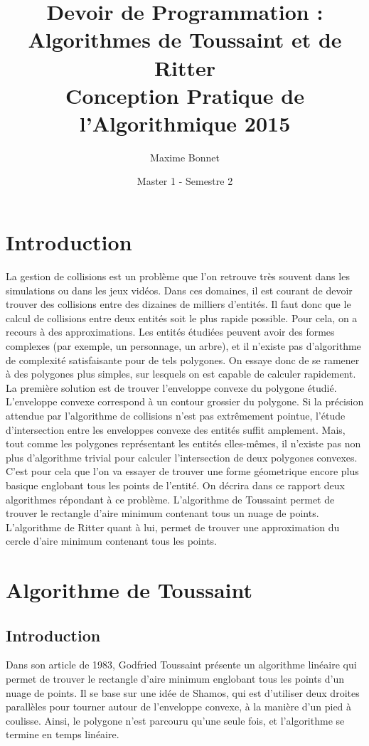 \documentclass[12pt]{report}
\title{
{Devoir de Programmation : Algorithmes de Toussaint et de Ritter}\\
{Conception Pratique de l'Algorithmique 2015}
}
\author{Maxime Bonnet}
\date{Master 1 - Semestre 2}
\begin{document}
\lstset{language=Java}
\maketitle

\tableofcontents
\chapter{Introduction}
La gestion de collisions est un problème que l'on retrouve très souvent dans les simulations ou dans les jeux vidéos. Dans ces domaines, il est courant de devoir trouver des collisions entre des dizaines de milliers d'entités. Il faut donc que le calcul de collisions entre deux entités soit le plus rapide possible. Pour cela, on a recours à des approximations. Les entités étudiées peuvent avoir des formes complexes (par exemple, un personnage, un arbre), et il n'existe pas d'algorithme de complexité satisfaisante pour de tels polygones. On essaye donc de se ramener à des polygones plus simples, sur lesquels on est capable de calculer rapidement. La première solution est de trouver l'enveloppe convexe du polygone étudié. L'enveloppe convexe correspond à un contour grossier du polygone. Si la précision attendue par l'algorithme de collisions n'est pas extrêmement pointue, l'étude d'intersection entre les enveloppes convexe des entités suffit amplement. Mais, tout comme les polygones représentant les entités elles-mêmes, il n'existe pas non plus d'algorithme trivial pour calculer l'intersection de deux polygones convexes. C'est pour cela que l'on va essayer de trouver une forme géometrique encore plus basique englobant tous les points de l'entité. On décrira dans ce rapport deux algorithmes répondant à ce problème. L'algorithme de Toussaint permet de trouver le rectangle d'aire minimum contenant tous un nuage de points. L'algorithme de Ritter quant à lui, permet de trouver une approximation du cercle d'aire minimum contenant tous les points.
\chapter{Algorithme de Toussaint}
\section{Introduction}
Dans son article de 1983, Godfried Toussaint présente un algorithme linéaire qui permet de trouver le rectangle d'aire minimum englobant tous les points d'un nuage de points. Il se base sur une idée de Shamos, qui est d'utiliser deux droites parallèles pour tourner autour de l'enveloppe convexe, à la manière d'un pied à coulisse. Ainsi, le polygone n'est parcouru qu'une seule fois, et l'algorithme se termine en temps linéaire.
\end{document}
